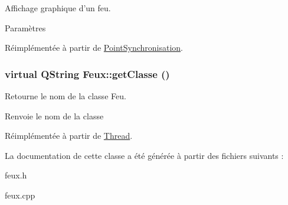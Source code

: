 Affichage graphique d'un feu. 


\begin{DoxyParams}{Paramètres}
\item[{\em }]\end{DoxyParams}


Réimplémentée à partir de \hyperlink{classPointSynchronisation_a53db6636fdb405bb30fab20b7dc4d374}{PointSynchronisation}.

\hypertarget{classFeux_ac06b420ea2bb015007eb03ca2401176e}{
\subsubsection[{getClasse}]{\setlength{\rightskip}{0pt plus 5cm}virtual QString Feux::getClasse ()}}
\label{classFeux_ac06b420ea2bb015007eb03ca2401176e}


Retourne le nom de la classe Feu. 

\begin{DoxyReturn}{Renvoie}
le nom de la classe 
\end{DoxyReturn}


Réimplémentée à partir de \hyperlink{classThread_ad055e7c603fda2607670f69c32b2d98a}{Thread}.



La documentation de cette classe a été générée à partir des fichiers suivants :\begin{DoxyCompactItemize}
\item 
feux.h\item 
feux.cpp\end{DoxyCompactItemize}
